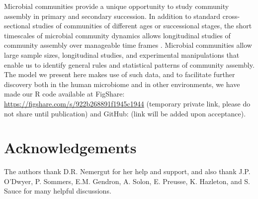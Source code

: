 \documentclass{article}
\begin{document}
\par
Microbial communities provide a unique opportunity to study community assembly in primary and secondary succession. In addition to standard cross-sectional studies of communities of different ages or successional stages, the short timescales of microbial community dynamics allows longitudinal studies of community assembly over manageable time frames \cite{David2014,Kennedy2016}. Microbial communities allow large sample sizes, longitudinal studies, and experimental manipulations that enable us to identify general rules and statistical patterns of community assembly. The model we present here makes use of such data, and to facilitate further discovery both in the human microbiome and in other environments, we have made our R code available at FigShare: \url{https://figshare.com/s/922b268891f1945c1944} (temporary private link, please do not share until publication) and GitHub: (link will be added upon acceptance).

\section{Acknowledgements}
The authors thank D.R. Nemergut for her help and support, and also thank J.P. O'Dwyer, P. Sommers, E.M. Gendron, A. Solon, E. Preusse, K. Hazleton, and S. Sauce for many helpful discussions. 


\newpage
\end{document}
